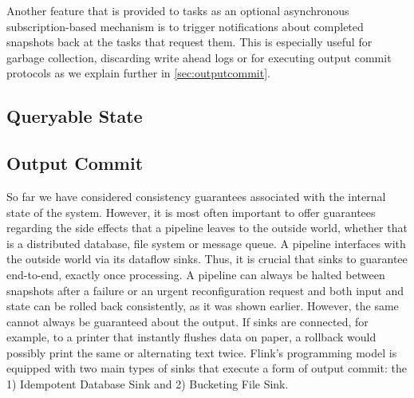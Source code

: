 Another feature that is provided to tasks as an optional asynchronous subscription-based mechanism is to trigger notifications about completed snapshots back at the tasks that request them. This is especially useful for garbage collection, discarding write ahead logs or for executing output commit protocols as we explain further in \autoref{sec:outputcommit}.

\subsection{Queryable State}

\subsection{Output Commit}
\label{sec:outputcommit}

So far we have considered consistency guarantees associated with the internal state of the system. However, it is most often important to offer guarantees regarding the side effects that a pipeline leaves to the outside world, whether that is a distributed database, file system or message queue. A pipeline interfaces with the outside world via its dataflow sinks. Thus, it is crucial that sinks to guarantee end-to-end, exactly once processing. A pipeline can always be halted between snapshots after a failure or an urgent reconfiguration request and both input and state can be rolled back consistently, as it was shown earlier. However, the same cannot always be guaranteed about the output. If sinks are connected, for example, to a printer that instantly flushes data on paper, a rollback would possibly print the same or alternating text twice. Flink's programming model is equipped with two main types of sinks that execute a form of output commit: the 1) Idempotent Database Sink and 2) Bucketing File Sink.

